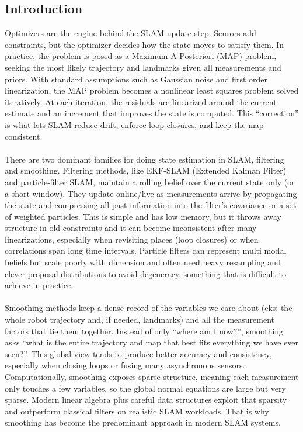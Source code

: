 \subsection{Introduction}
Optimizers are the engine behind the SLAM update step. Sensors add constraints, but the optimizer decides how the state moves to satisfy them. In practice, the problem is posed as a Maximum A Posteriori (MAP) problem, seeking the most likely trajectory and landmarks given all measurements and priors. With standard assumptions such as Gaussian noise and first order linearization, the MAP problem becomes a nonlinear least squares problem solved iteratively. At each iteration, the residuals are linearized around the current estimate and an increment that improves the state is computed. This ``correction'' is what lets SLAM reduce drift, enforce loop closures, and keep the map consistent. \cite{SLAM_part_present_future}
\\ \\
There are two dominant families for doing state estimation in SLAM, filtering and smoothing. Filtering methods, like EKF-SLAM (Extended Kalman Filter) and particle-filter SLAM, maintain a rolling belief over the current state only (or a short window). They update online/live as measurements arrive by propagating the state and compressing all past information into the filter's covariance or a set of weighted particles. This is simple and has low memory, but it throws away structure in old constraints and it can become inconsistent after many linearizations, especially when revisiting places (loop closures) or when correlations span long time intervals. Particle filters can represent multi modal beliefs but scale poorly with dimension and often need heavy resampling and clever proposal distributions to avoid degeneracy, something that is difficult to achieve in practice. \cite{SLAM_tutorial_part_1}\cite{SLAM_tutorial_part_2}
\\ \\
Smoothing methods keep a dense record of the variables we care about (eks: the whole robot trajectory and, if needed, landmarks) and all the measurement factors that tie them together. Instead of only ``where am I now?'', smoothing asks ``what is the entire trajectory and map that best fits everything we have ever seen?''. This global view tends to produce better accuracy and consistency, especially when closing loops or fusing many asynchronous sensors. Computationally, smoothing exposes sparse structure, meaning each measurement only touches a few variables, so the global normal equations are large but very sparse. Modern linear algebra plus careful data structures exploit that sparsity and outperform classical filters on realistic SLAM workloads. That is why smoothing has become the predominant approach in modern SLAM systems.
